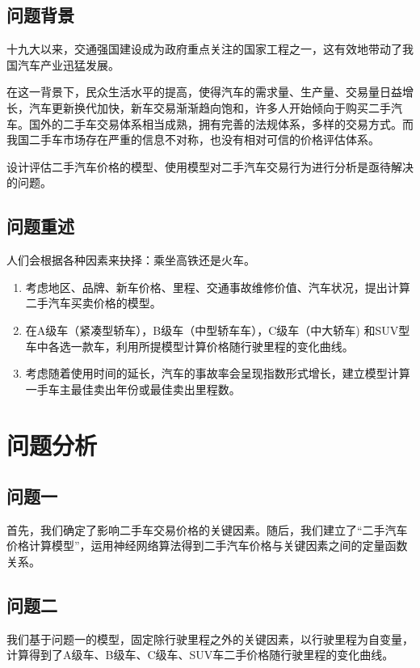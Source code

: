 \documentclass{ctexart}
\newcounter{sub}
\begin{document}
\subsection{问题背景}%
\label{sub:问题背景}
十九大以来，交通强国建设成为政府重点关注的国家工程之一，这有效地带动了我国汽车产业迅猛发展。

在这一背景下，民众生活水平的提高，使得汽车的需求量、生产量、交易量日益增长，汽车更新换代加快，新车交易渐渐趋向饱和，许多人开始倾向于购买二手汽车。国外的二手车交易体系相当成熟，拥有完善的法规体系，多样的交易方式。而我国二手车市场存在严重的信息不对称，也没有相对可信的价格评估体系。

设计评估二手汽车价格的模型、使用模型对二手汽车交易行为进行分析是亟待解决的问题。

\subsection{问题重述}%
\label{sub:问题重述}
人们会根据各种因素来抉择：乘坐高铁还是火车。
\begin{enumerate}
	\item 考虑地区、品牌、新车价格、里程、交通事故维修价值、汽车状况，提出计算二手汽车买卖价格的模型。
	\item 在A级车（紧凑型轿车），B级车（中型轿车车），C级车（中大轿车) 和SUV型车中各选一款车，利用所提模型计算价格随行驶里程的变化曲线。
	\item 考虑随着使用时间的延长，汽车的事故率会呈现指数形式增长，建立模型计算一手车主最佳卖出年份或最佳卖出里程数。

\end{enumerate}
\newpage

\section{问题分析}%
\label{sec:问题分析}

\subsection{问题一}
首先，我们确定了影响二手车交易价格的关键因素。随后，我们建立了“二手汽车价格计算模型”，运用神经网络算法得到二手汽车价格与关键因素之间的定量函数关系。 \cite{周志华-机器学习}

\subsection{问题二}
我们基于问题一的模型，固定除行驶里程之外的关键因素，以行驶里程为自变量，计算得到了A级车、B级车、C级车、SUV车二手价格随行驶里程的变化曲线。 %
\end{document}
